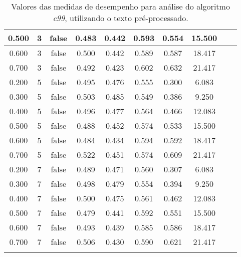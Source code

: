 \begin{longtable}[c]{|c|c|c|c|c|c|c|c|c|c|}
 0.500 & 3 & false & 0.483 & 0.442 & 0.593 & 0.554 & 15.500  \\ \hline 
 0.600 & 3 & false & 0.500 & 0.442 & 0.589 & 0.587 & 18.417  \\ \hline 
 0.700 & 3 & false & 0.492 & 0.423 & 0.602 & 0.632 & 21.417  \\ \hline 
 0.200 & 5 & false & 0.495 & 0.476 & 0.555 & 0.300 & 6.083  \\ \hline 
 0.300 & 5 & false & 0.503 & 0.485 & 0.549 & 0.386 & 9.250  \\ \hline 
 0.400 & 5 & false & 0.496 & 0.477 & 0.564 & 0.466 & 12.083  \\ \hline 
 0.500 & 5 & false & 0.488 & 0.452 & 0.574 & 0.533 & 15.500  \\ \hline 
 0.600 & 5 & false & 0.484 & 0.434 & 0.594 & 0.592 & 18.417  \\ \hline 
 0.700 & 5 & false & 0.522 & 0.451 & 0.574 & 0.609 & 21.417  \\ \hline 
 0.200 & 7 & false & 0.489 & 0.471 & 0.560 & 0.307 & 6.083  \\ \hline 
 0.300 & 7 & false & 0.498 & 0.479 & 0.554 & 0.394 & 9.250  \\ \hline 
 0.400 & 7 & false & 0.500 & 0.475 & 0.561 & 0.462 & 12.083  \\ \hline 
 0.500 & 7 & false & 0.479 & 0.441 & 0.592 & 0.551 & 15.500  \\ \hline 
 0.600 & 7 & false & 0.493 & 0.439 & 0.585 & 0.586 & 18.417  \\ \hline 
 0.700 & 7 & false & 0.506 & 0.430 & 0.590 & 0.621 & 21.417  \\ \hline 
 \caption{Valores das medidas de desempenho para análise do algoritmo \textit{c99}, utilizando o texto pré-processado.}
 \end{longtable} 




 \newpage

